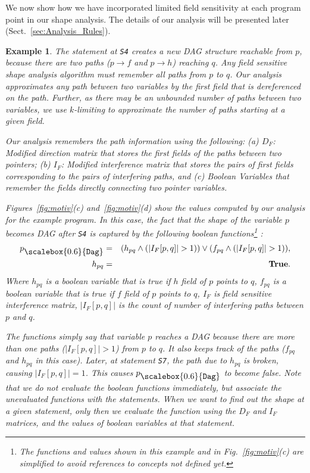 \documentclass[letterpaper]{sig-alternate}
\newtheorem{example}{Example}
\newcommand{\p}{\ensuremath{p}}
\newcommand{\q}{\ensuremath{q}}
\newcommand{\subD}{\mbox{\scalebox{0.6}{\Dag}}}
\newcommand{\num}[1]{\ensuremath{|#1|}}
\newcommand{\IFM}[2]{\ensuremath{I_F[#1,#2]}}
\newcommand{\Dag}{{\tt Dag}}
\newcommand{\true}{\textbf{True}}
\begin{document}
We now show how we have incorporated limited field
sensitivity at each program point in our shape
analysis. The details of our analysis will be presented later
(Sect.~\ref{sec:Analysis_Rules}).

\begin{example}{\rm 
The statement at {\tt S4} creates a new DAG structure
reachable from $\p$, because there are two paths ($\p
\rightarrow f$ and $\p \rightarrow h$) reaching $\q$. Any
field sensitive shape analysis algorithm must remember all
paths from $\p$ to $\q$. Our analysis approximates any
path between two variables by the first field that is
dereferenced on the path. Further, as there may be an
unbounded number of paths between two variables, we use
$k$-limiting to approximate the number of paths starting at a
given field.

Our analysis remembers the path information using the
following: (a) $D_F$: Modified direction matrix that stores
the first fields of the paths between two pointers; (b)
$I_F$: Modified interference matrix that stores the pairs of
first fields corresponding to the pairs of interfering paths,
and (c) Boolean Variables that remember the fields directly
connecting two pointer variables.

Figures~\ref{fig:motiv}(c) and~\ref{fig:motiv}(d) show the
values computed by our analysis for the example program. In
this case, the fact that the shape of the variable $\p$
becomes DAG after {\tt S4} is captured by the following
boolean functions\footnote{The functions and values shown in
  this example and in Fig.~\ref{fig:motiv}(c) are simplified
  to avoid references to concepts not defined yet.}
:
\begin{eqnarray*}
  p_{\subD} &=& (h_{pq} \wedge (\num{\IFM{p}{q}} > 1)) \vee
  (f_{pq} \wedge (\num{\IFM{p}{q}} > 1)), \\ 
  \qquad h_{pq} &=& \true.
\end{eqnarray*}
Where $h_{pq}$ is a boolean variable that is true if $h$
field of $\p$ points to $\q$, $f_{pq}$ is a boolean
variable that is true if $f$ field of $\p$ points to
$\q$, $I_F$ is field sensitive interference matrix,
$\num{I_F[p,q]}$ is the count of number of interfering paths
between $\p$ and $\q$. 

The functions simply say that variable $\p$ reaches a DAG
because there are more than one paths ($\num{I_F[p,q]} > 1$)
from $\p$ to $\q$. It also keeps track of the paths ($f_{pq}$
and $h_{pq}$ in this case). Later, at statement {\tt S7},
the path due to $h_{pq}$ is broken, causing $\num{I_F[p,q]} =
1$. This causes $\p_{\subD}$ to become false. Note that we
{\em do not} evaluate the boolean functions immediately, but
associate the unevaluated functions with the statements. When
we want to find out the shape at a given statement, only then
we evaluate the function using the $D_F$ and $I_F$ matrices,
and the values of boolean variables at that statement.

}
\end{example}
\end{document}
